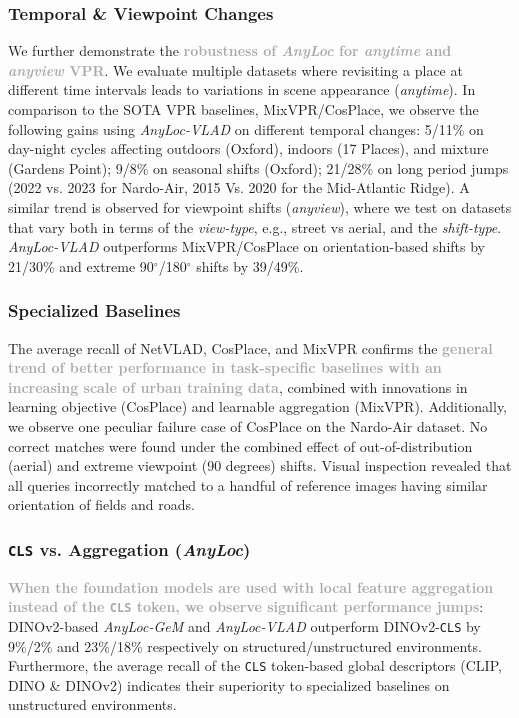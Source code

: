 \documentclass[letterpaper, 10 pt, conference]{ieeeconf}  \fi
\newcommand{\highlight}[1]{\textcolor{darkgray}{\textbf{#1}}}
\newcommand{\coolname}{\textit{AnyLoc}}
\newcommand{\coolaggshort}[1]{\textit{AnyLoc-{#1}}}
\newcommand{\dino}{\mbox{DINO}}
\newcommand{\dinovtwo}{\mbox{DINOv2}}
\begin{document}
\subsubsection{Temporal \& Viewpoint Changes} 

We further demonstrate the \highlight{robustness of \coolname{} for \textit{anytime} and \textit{anyview} VPR}.
We evaluate multiple datasets where revisiting a place at different time intervals leads to variations in scene appearance (\textit{anytime}).
In comparison to the SOTA VPR baselines, MixVPR/CosPlace, we observe the following gains using \coolaggshort{VLAD} on different temporal changes: {5/11}\% on day-night cycles affecting outdoors (Oxford), indoors (17 Places), and mixture (Gardens Point); {9/8}\% on seasonal shifts (Oxford); {21/28}\% on long period jumps (2022 vs. 2023 for Nardo-Air, 2015 Vs. 2020 for the Mid-Atlantic Ridge).
A similar trend is observed for viewpoint shifts (\textit{anyview}), where we test on datasets that vary both in terms of the \textit{view-type}, e.g., street vs aerial, and the \textit{shift-type}. 
\coolaggshort{VLAD} outperforms MixVPR/CosPlace on orientation-based shifts by {21/30}\% and extreme 90$^\circ$/180$^\circ$ shifts by {39/49}\%.

\subsubsection{Specialized Baselines} 

The average recall of NetVLAD, CosPlace, and MixVPR confirms the \highlight{general trend of better performance in task-specific baselines with an increasing scale of urban training data}, combined with innovations in learning objective (CosPlace) and learnable aggregation (MixVPR).
Additionally, we observe one peculiar failure case of CosPlace on the Nardo-Air dataset.
No correct matches were found under the combined effect of out-of-distribution (aerial) and extreme viewpoint (90 degrees) shifts.
Visual inspection revealed that all queries incorrectly matched to a handful of reference images having similar orientation of fields and roads.

\subsubsection{\texttt{CLS} vs. Aggregation (\coolname{})} 

\highlight{When the foundation models are used with local feature aggregation instead of the \texttt{CLS} token, we observe significant performance jumps}: \dinovtwo{}-based \coolaggshort{GeM} and \coolaggshort{VLAD} outperform \dinovtwo{}-\texttt{CLS} by 9\%/2\% and 23\%/18\% respectively on structured/unstructured environments.
Furthermore, the average recall of the \texttt{CLS} token-based global descriptors (CLIP, \dino{} \& \dinovtwo{}) indicates their superiority to specialized baselines on unstructured environments.
\end{document}
